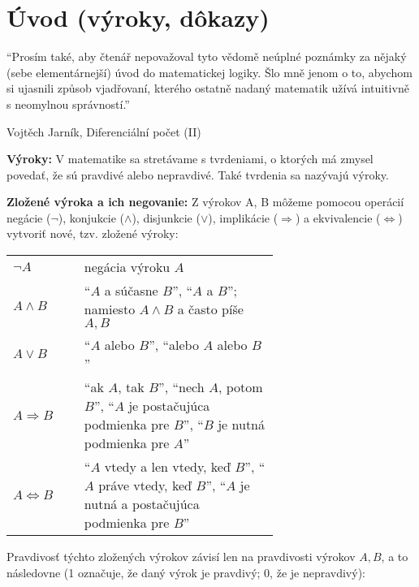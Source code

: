 \chapter*{Úvod (výroky, dôkazy)}


\epigraph{
  \enquote{Prosím také, aby čtenář nepovažoval tyto vědomě neúplné poznámky za
nějaký (sebe elementárnejší) úvod do matematickej logiky. Šlo mně jenom o to,
abychom si ujasnili způsob vjadřovaní, kterého ostatně nadaný matematik užívá
intuitivně s neomylnou správností.}
}{Vojtěch Jarník, Diferenciální počet (II)}

\textbf{Výroky:}
V matematike sa stretávame s tvrdeniami, o ktorých má
zmysel povedať, že sú pravdivé alebo nepravdivé. Také tvrdenia sa nazývajú
výroky.

\textbf{Zložené výroka a ich negovanie:}
Z výrokov A, B môžeme pomocou operácií negácie ($\neg$), konjukcie
($\land$), disjunkcie ($\lor$), implikácie ($\Rightarrow$) a ekvivalencie
($\iff$) vytvoriť nové, tzv. zložené výroky:

\begin{center}
  \begin{tabular}{ m{0.15\linewidth} p{0.5\linewidth} }
    $\neg A$ & negácia výroku $A$ \\
    \bigskip
    $A \land B$
      & \enquote{$A$ a súčasne $B$},
        \enquote{$A$ a $B$};
        namiesto $A \land B$ a často píše $A, B$ \\
    \bigskip
    $A \lor B$
      & \enquote{$A$ alebo $B$},
        \enquote{alebo $A$ alebo $B$} \\
    \bigskip
    $A \Rightarrow B$
      & \enquote{ak $A$, tak $B$},
        \enquote{nech $A$, potom $B$},
        \enquote{$A$ je postačujúca podmienka pre $B$},
        \enquote{$B$ je nutná podmienka pre $A$} \\
    \bigskip
    $A \iff B$
      & \enquote{$A$ vtedy a len vtedy, keď $B$},
        \enquote{$A$ práve vtedy, keď $B$},
        \enquote{$A$ je nutná a postačujúca podmienka pre $B$} \\
  \end{tabular}
\end{center}

Pravdivosť týchto zložených výrokov závisí len na pravdivosti výrokov $A, B$,
a to následovne (1 označuje, že daný výrok je pravdivý; 0, že je nepravdivý):


